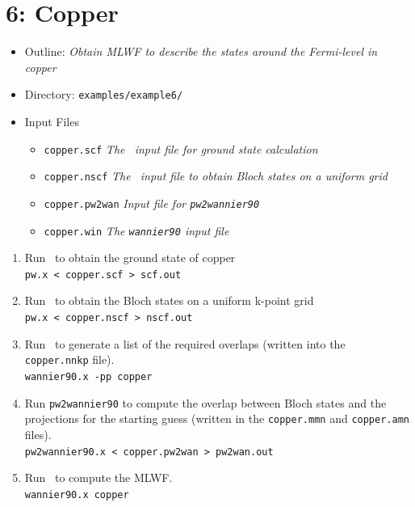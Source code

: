 \documentclass[a4paper,11pt,twoside]{article}
\begin{document}
\cleardoublepage

\section*{6: Copper}

\begin{itemize}
\item{Outline: \it{Obtain MLWF to describe the states around the
    Fermi-level in copper}}
\item{Directory: {\tt examples/example6/}}
\item{Input Files}
\begin{itemize}
\item{ {\tt copper.scf}  {\it The \pwscf\ input file for ground state
    calculation}} 
\item{ {\tt copper.nscf}  {\it The \pwscf\ input file to obtain Bloch states
    on a uniform grid}} 
\item{ {\tt copper.pw2wan}  {\it Input file for {\tt pw2wannier90}}}
\item{ {\tt copper.win}  {\it The {\tt wannier90} input file}}
\end{itemize}

\end{itemize}

\begin{enumerate}
\item Run \pwscf\ to obtain the ground state of copper\\
{\tt pw.x < copper.scf > scf.out}

\item Run \pwscf\ to obtain the Bloch states on a uniform k-point grid\\
{\tt pw.x < copper.nscf > nscf.out}

\item Run \wannier\ to generate a list of the required overlaps (written
  into the {\tt copper.nnkp} file).\\ 
{\tt wannier90.x -pp copper}

\item Run {\tt pw2wannier90} to compute the overlap between Bloch
  states and the projections for the starting guess (written in the
  {\tt copper.mmn} and {\tt copper.amn} files).\\  
{\tt pw2wannier90.x < copper.pw2wan > pw2wan.out}

\item Run \wannier\ to compute the MLWF.\\
{\tt wannier90.x copper}
\end{enumerate}
\end{document}
